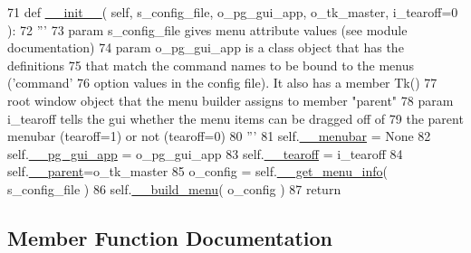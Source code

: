 \begin{DoxyCode}
71     \textcolor{keyword}{def }\hyperlink{classnegui_1_1pgmenubuilder_1_1PGMenuBuilder_a8e612e54bfe556d763a7150d8d8cbec5}{\_\_init\_\_}( self, s\_config\_file, o\_pg\_gui\_app,  o\_tk\_master, i\_tearoff=0 ):
72         \textcolor{stringliteral}{'''}
73 \textcolor{stringliteral}{        param s\_config\_file gives menu attribute values (see module documentation)}
74 \textcolor{stringliteral}{        param o\_pg\_gui\_app is a class object that has the definitions}
75 \textcolor{stringliteral}{                that match the command names to be bound to the menus ('command' }
76 \textcolor{stringliteral}{                option values in the config file). It also has a member Tk()}
77 \textcolor{stringliteral}{                root window object that the menu builder assigns to member "parent"}
78 \textcolor{stringliteral}{        param i\_tearoff tells the gui whether the menu items can be dragged off of }
79 \textcolor{stringliteral}{            the parent menubar (tearoff=1) or not (tearoff=0)}
80 \textcolor{stringliteral}{        '''}
81         self.\hyperlink{classnegui_1_1pgmenubuilder_1_1PGMenuBuilder_ae68d0c5a32a42f23fae44d177125e639}{\_\_menubar} = \textcolor{keywordtype}{None}
82         self.\hyperlink{classnegui_1_1pgmenubuilder_1_1PGMenuBuilder_af0a1a02f4ae4cb51ddcae82ff1bda3b8}{\_\_pg\_gui\_app} = o\_pg\_gui\_app
83         self.\hyperlink{classnegui_1_1pgmenubuilder_1_1PGMenuBuilder_aa1c29f9898f4129fa7a8c3fa52498322}{\_\_tearoff} = i\_tearoff
84         self.\hyperlink{classnegui_1_1pgmenubuilder_1_1PGMenuBuilder_a96fdfb4d4b5bfc2cb502ca5c513f4326}{\_\_parent}=o\_tk\_master
85         o\_config = self.\hyperlink{classnegui_1_1pgmenubuilder_1_1PGMenuBuilder_af9e8faf1c4c173851774fb37f0900a2c}{\_\_get\_menu\_info}( s\_config\_file )
86         self.\hyperlink{classnegui_1_1pgmenubuilder_1_1PGMenuBuilder_a308e619e77dc646c8668bbced4171394}{\_\_build\_menu}( o\_config )
87         \textcolor{keywordflow}{return}
\end{DoxyCode}


\subsection{Member Function Documentation}
